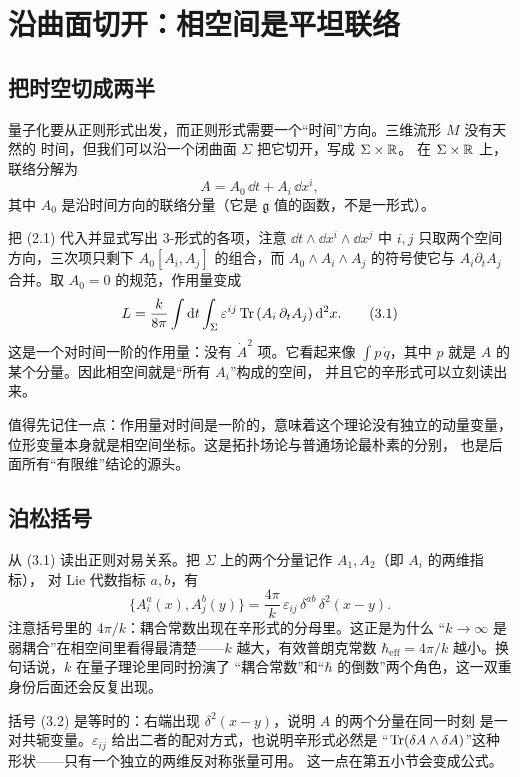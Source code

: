 \section{沿曲面切开：相空间是平坦联络}

\subsection{把时空切成两半}

量子化要从正则形式出发，而正则形式需要一个“时间”方向。三维流形 $M$ 没有天然的
时间，但我们可以沿一个闭曲面 $\Sigma$ 把它切开，写成 $\Sigma\times\mathbb{R}$。
在 $\Sigma\times\mathbb{R}$ 上，联络分解为
\[
A=A_0\,\dd t+A_i\,\dd x^i,
\]
其中 $A_0$ 是沿时间方向的联络分量（它是 $\mathfrak g$ 值的函数，不是一形式）。

把 (2.1) 代入并显式写出 $3$-形式的各项，注意 $\dd t\wedge\dd x^i\wedge\dd x^j$ 中
$i,j$ 只取两个空间方向，三次项只剩下 $A_0[A_i,A_j]$ 的组合，而 $A_0\wedge A_i\wedge A_j$
的符号使它与 $A_i\partial_tA_j$ 合并。取 $A_0=0$ 的规范，作用量变成
\begin{equation}
L=\frac{k}{8\pi}\int\mathrm{d} t\int_\Sigma \varepsilon^{ij}\operatorname{Tr}\left(A_i\,\partial_tA_j\right)\mathrm{d}^2x. \tag{3.1}
\end{equation}
这是一个对时间一阶的作用量：没有 $\dot A^2$ 项。它看起来像
$\int p\,\dot q$，其中 $p$ 就是 $A$ 的某个分量。因此相空间就是“所有 $A_i$”构成的空间，
并且它的辛形式可以立刻读出来。

值得先记住一点：作用量对时间是一阶的，意味着这个理论没有独立的动量变量，
位形变量本身就是相空间坐标。这是拓扑场论与普通场论最朴素的分别，
也是后面所有“有限维”结论的源头。

\subsection{泊松括号}

从 (3.1) 读出正则对易关系。把 $\Sigma$ 上的两个分量记作 $A_1,A_2$（即 $A_i$ 的两维指标），
对 Lie 代数指标 $a,b$，有
\begin{equation}
\{A_i^a(x),A_j^b(y)\}=\frac{4\pi}{k}\,\varepsilon_{ij}\,\delta^{ab}\,\delta^2(x-y). \tag{3.2}
\end{equation}
注意括号里的 $4\pi/k$：耦合常数出现在辛形式的分母里。这正是为什么
“$k\to\infty$ 是弱耦合”在相空间里看得最清楚——$k$ 越大，有效普朗克常数
$\hbar_{\text{eff}}=4\pi/k$ 越小。换句话说，$k$ 在量子理论里同时扮演了
“耦合常数”和“$\hbar$ 的倒数”两个角色，这一双重身份后面还会反复出现。

括号 (3.2) 是等时的：右端出现 $\delta^2(x-y)$，说明 $A$ 的两个分量在同一时刻
是一对共轭变量。$\varepsilon_{ij}$ 给出二者的配对方式，也说明辛形式必然是
“$\operatorname{Tr}(\delta A\wedge\delta A)$”这种形状——只有一个独立的两维反对称张量可用。
这一点在第五小节会变成公式。

